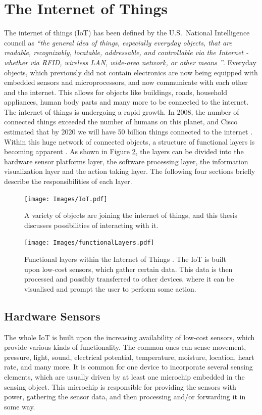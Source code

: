 \section{The Internet of Things}
\label{sec:internetOfThings}
The internet of things (IoT) has been defined by the U.S.\ National Intelligence council as \emph{``the general idea of things, especially everyday objects, that are readable, recognizably, locatable, addressable, and controllable via the Internet - whether via RFID, wireless LAN, wide-area network, or other means \cite{disruptiveTechnologies}''}.
Everyday objects, which previously did not contain electronics are now being equipped with embedded sensors and microprocessors, and now communicate with each other and the internet. 
This allows for objects like buildings, roads, household appliances, human body parts and many more to be connected to the internet. 
The internet of things is undergoing a rapid growth. 
In 2008, the number of connected things exceeded the number of humans on this planet, and Cisco estimated that by 2020 we will have 50 billion things connected to the internet \cite{evans12}. 
Within this huge network of connected objects, a structure of functional layers is becoming apparent \cite{swan12}. 
As shown in Figure \ref{fig:functionalLayers}, the layers can be divided into the hardware sensor platforms layer, the software processing layer, the information visualization layer and the action taking layer. 
The following four sections briefly describe the responsibilities of each layer.
\begin{figure}[!t]
\centering
\texttt{[image: Images/IoT.pdf]}
\caption{A variety of objects are joining the internet of things, and this thesis discusses possibilities of interacting with it.}
\label{fig:iot}
\end{figure}

\begin{figure}[!t]
\centering
\texttt{[image: Images/functionalLayers.pdf]}
\caption{Functional layers within the Internet of Things \cite{swan12}. The IoT is built upon low-cost sensors, which gather certain data. This data is then processed and possibly transferred to other devices, where it can be visualised and prompt the user to perform some action.}
\label{fig:functionalLayers}
\end{figure}

\subsection{Hardware Sensors}
\label{sec:hardwareSensors}
The whole IoT is built upon the increasing availability of low-cost sensors, which provide various kinds of functionality.
The common ones can sense movement, pressure, light, sound, electrical potential, temperature, moisture, location, heart rate, and many more.
It is common for one device to incorporate several sensing elements, which are usually driven by at least one microchip embedded in the sensing object.
This microchip is responsible for providing the sensors with power, gathering the sensor data, and then processing and/or forwarding it in some way.

